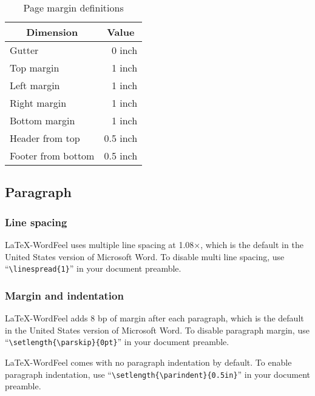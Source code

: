 \documentclass[letterpaper]{wordfeel}
\begin{document}
\begin{table}[htb]
    \centering
    \caption{Page margin definitions}
    \label{tab:page-margin}
    \begin{tabular}{lr}
        \toprule
        \multicolumn{1}{c}{Dimension} & \multicolumn{1}{c}{Value} \\
        \midrule
        Gutter & 0 inch \\
        Top margin & 1 inch \\
        Left margin & 1 inch \\
        Right margin & 1 inch \\
        Bottom margin & 1 inch \\
        Header from top & 0.5 inch \\
        Footer from bottom & 0.5 inch \\
        \bottomrule
    \end{tabular}
\end{table}

\FloatBarrier

\subsection{Paragraph}

\subsubsection{Line spacing}

\LaTeX-WordFeel uses multiple line spacing at 1.08×, which is the default in the United States version of Microsoft Word. To disable multi line spacing, use ``\texttt{\textbackslash{}linespread\{1\}}'' in your document preamble.

\subsubsection{Margin and indentation}

\LaTeX-WordFeel adds 8 bp of margin after each paragraph, which is the default in the United States version of Microsoft Word. To disable paragraph margin, use ``\texttt{\textbackslash{}setlength\{\textbackslash{}parskip\}\{0pt\}}'' in your document preamble.

\LaTeX-WordFeel comes with no paragraph indentation by default. To enable paragraph indentation, use ``\texttt{\textbackslash{}setlength\{\textbackslash{}parindent\}\{0.5in\}}'' in your document preamble.
\end{document}
